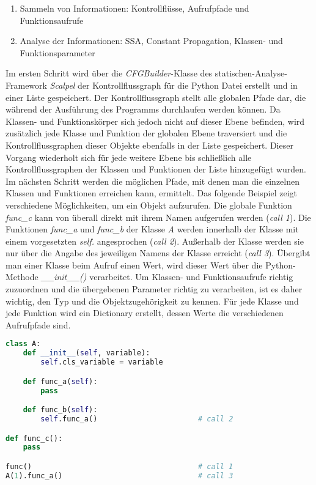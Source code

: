 \documentclass[german,bachelor]{swsLeipzig}
\begin{document}
\begin{enumerate}
 \item Sammeln von Informationen: Kontrollflüsse, Aufrufpfade und Funktionsaufrufe
 \item Analyse der Informationen: SSA, Constant Propagation, Klassen- und Funktionsparameter
\end{enumerate}

Im ersten Schritt wird über die \textit{CFGBuilder}-Klasse des statischen-Analyse-Framework \textit{Scalpel} der
Kontrollflussgraph für die Python Datei erstellt und in einer Liste gespeichert.
Der Kontrollflussgraph stellt alle globalen Pfade dar, die während der Ausführung des Programms durchlaufen werden können.
Da Klassen- und Funktionskörper sich jedoch nicht auf dieser Ebene befinden, wird zusätzlich jede Klasse und Funktion
der globalen Ebene traversiert und die Kontrollflussgraphen dieser Objekte ebenfalls in der Liste gespeichert.
Dieser Vorgang wiederholt sich für jede weitere Ebene bis schließlich alle Kontrollflussgraphen der
Klassen und Funktionen der Liste hinzugefügt wurden. \\

Im nächsten Schritt werden die möglichen Pfade, mit denen man die einzelnen Klassen und Funktionen erreichen kann, ermittelt.
Das folgende Beispiel zeigt verschiedene Möglichkeiten, um ein Objekt aufzurufen.
Die globale Funktion \textit{func\_c} kann von überall direkt mit ihrem Namen aufgerufen werden (\textit{call 1}).
Die Funktionen \textit{func\_a} und \textit{func\_b} der Klasse \textit{A} werden innerhalb der Klasse mit einem vorgesetzten
\textit{self.} angesprochen (\textit{call 2}).
Außerhalb der Klasse werden sie nur über die Angabe des jeweiligen Namens der Klasse erreicht (\textit{call 3}).
Übergibt man einer Klasse beim Aufruf einen Wert, wird dieser Wert über die Python-Methode \textit{\_\_init\_\_()} verarbeitet.
Um Klassen- und Funktionsaufrufe richtig zuzuordnen und die übergebenen Parameter richtig zu verarbeiten,
ist es daher wichtig, den Typ und die Objektzugehörigkeit zu kennen.
Für jede Klasse und jede Funktion wird ein Dictionary erstellt, dessen Werte die verschiedenen Aufrufpfade sind. \\

\begin{lstlisting}[language=Python, frame=single, basicstyle=\small]
class A:
    def __init__(self, variable):
        self.cls_variable = variable

    def func_a(self):
        pass

    def func_b(self):
        self.func_a()                       # call 2

def func_c():
    pass

func()                                      # call 1
A(1).func_a()                               # call 3
\end{lstlisting}
\
\end{document}
